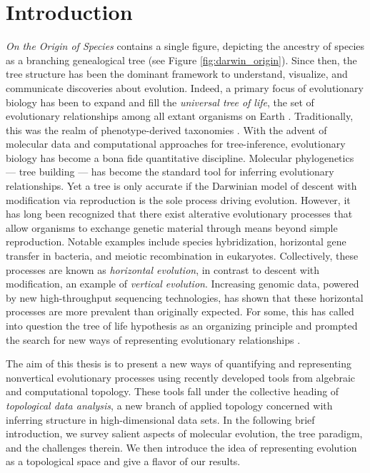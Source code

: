 \chapter{Introduction}
\label{ch:introduction}


\emph{On the Origin of Species} contains a single figure, depicting the ancestry of species as a branching genealogical tree \cite{Darwin:1859uh} (see Figure \ref{fig:darwin_origin}).
Since then, the tree structure has been the dominant framework to understand, visualize, and communicate discoveries about evolution.
Indeed, a primary focus of evolutionary biology has been to expand and fill the \emph{universal tree of life}, the set of evolutionary relationships among all extant organisms on Earth \cite{Bowler:2003uz}.
Traditionally, this was the realm of phenotype-derived taxonomies \kje{[cite]}.
With the advent of molecular data and computational approaches for tree-inference, evolutionary biology has become a bona fide quantitative discipline.
Molecular phylogenetics --- tree building --- has become the standard tool for inferring evolutionary relationships.
Yet a tree is only accurate if the Darwinian model of descent with modification via reproduction is the sole process driving evolution.
However, it has long been recognized that there exist alterative evolutionary processes that allow organisms to exchange genetic material through means beyond simple reproduction.
Notable examples include species hybridization, horizontal gene transfer in bacteria, and meiotic recombination in eukaryotes.
Collectively, these processes are known as \emph{horizontal evolution}, in contrast to descent with modification, an example of \emph{vertical evolution}.
Increasing genomic data, powered by new high-throughput sequencing technologies, has shown that these horizontal processes are more prevalent than originally expected.
For some, this has called into question the tree of life hypothesis as an organizing principle and prompted the search for new ways of representing evolutionary relationships \cite{Doolittle:1999,OMalley:2011tu}.

The aim of this thesis is to present a new ways of quantifying and representing nonvertical evolutionary processes using recently developed tools from algebraic and computational topology.
These tools fall under the collective heading of \emph{topological data analysis}, a new branch of applied topology concerned with inferring structure in high-dimensional data sets.
In the following brief introduction, we survey salient aspects of molecular evolution, the tree paradigm, and the challenges therein.
We then introduce the idea of representing evolution as a topological space and give a flavor of our results.

